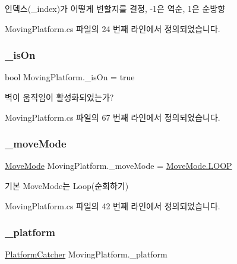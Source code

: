 인덱스(\+\_\+index)가 어떻게 변할지를 결정, -\/1은 역순, 1은 순방향 



Moving\+Platform.\+cs 파일의 24 번째 라인에서 정의되었습니다.

\mbox{\label{class_moving_platform_a6721f91607e56294fb807a00ccfaafad}} 
\subsubsection{\texorpdfstring{\_isOn}{\_isOn}}
{\footnotesize\ttfamily bool Moving\+Platform.\+\_\+is\+On = true\hspace{0.3cm}{\ttfamily [private]}}



벽이 움직임이 활성화되었는가? 



Moving\+Platform.\+cs 파일의 67 번째 라인에서 정의되었습니다.

\mbox{\label{class_moving_platform_a47308284bdf720a8fe919a69f2c0019b}} 
\subsubsection{\texorpdfstring{\_moveMode}{\_moveMode}}
{\footnotesize\ttfamily \mbox{\hyperlink{class_moving_platform_a7b3427d2906069ecf4c39d69eee53653}{Move\+Mode}} Moving\+Platform.\+\_\+move\+Mode = \mbox{\hyperlink{class_moving_platform_a7b3427d2906069ecf4c39d69eee53653a9159b3578e4e1eb31ffdf90acd6f6e40}{Move\+Mode.\+L\+O\+OP}}}



기본 Move\+Mode는 Loop(순회하기) 



Moving\+Platform.\+cs 파일의 42 번째 라인에서 정의되었습니다.

\mbox{\label{class_moving_platform_a2269ebd689de9ad6368f64b6b14cecb6}} 
\subsubsection{\texorpdfstring{\_platform}{\_platform}}
{\footnotesize\ttfamily \mbox{\hyperlink{class_platform_catcher}{Platform\+Catcher}} Moving\+Platform.\+\_\+platform}



